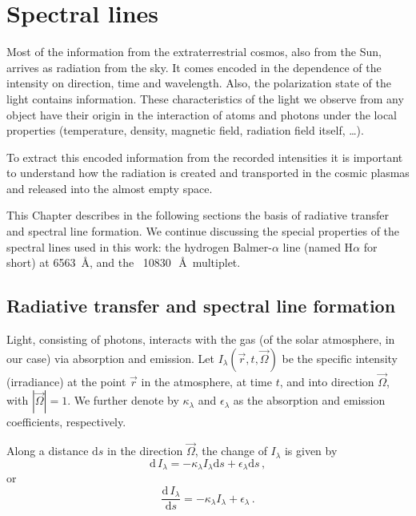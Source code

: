 \chapter{Spectral lines}

Most of the information from the extraterrestrial cosmos, also from the Sun, arrives as radiation from the sky. It comes encoded in the dependence of the intensity on direction, time and wavelength. Also, the polarization state of the light contains information. These characteristics of the light we observe from any object have their origin in the interaction of atoms and photons under the local properties (temperature, density, magnetic field, radiation field itself, \dots).

To extract this encoded information from the recorded intensities it is important to understand how the radiation is created and transported in the cosmic plasmas and released into the almost empty space. 

This Chapter describes in the following sections the basis of radiative transfer and spectral line formation. We continue discussing the special properties of the spectral lines used in this work: the hydrogen Balmer-$\alpha$ line (named H$\alpha$ for short) at 6563~\AA, and the \mbox{ 10830\, \AA}\, multiplet. %


\section{Radiative transfer and spectral line formation}
Light, consisting of photons, interacts with the gas (of the solar atmosphere, in our case) via absorption and emission. Let  $I_{\lambda}(\vec{r},t,\vec{\Omega})$ be the specific intensity (irradiance) at the point $\vec{r}$ in the atmosphere, at time $t$, and into direction $\vec{\Omega}$, with   $|\vec{\Omega}|=1$. We further denote by $\kappa_{\lambda}$ and $\epsilon_{\lambda}$ as the absorption and emission coefficients, respectively. 

Along a distance $\mathrm{d}s$ in the direction $\vec{\Omega}$, the change of $I_{\lambda}$ is given by
\begin{equation}
\mathrm{d}\,I_{\lambda}= -\kappa_{\lambda}I_{\lambda} \mathrm{d}s + \epsilon_{\lambda} \mathrm{d}s\, ,
\end{equation}
or
\begin{equation}
\frac{\mathrm{d}\,I_{\lambda}}{\mathrm{d}s}= -\kappa_{\lambda}I_{\lambda}+ \epsilon_{\lambda}\, .
\label{radtran}
\end{equation}
 
